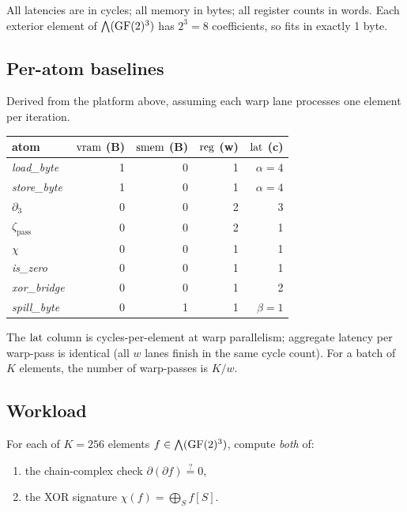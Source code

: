 All latencies are in cycles; all memory in bytes; all
register counts in words. Each exterior element of
$\bigwedge(\operatorname{GF}(2)^3)$ has $2^3 = 8$ coefficients, so
fits in exactly 1 byte.

\subsection{Per-atom baselines}\label{app-e:atoms}

Derived from the platform above, assuming each warp
lane processes one element per iteration.

\begin{center}
\begin{tabular}{l|rrrr}
atom           & $\operatorname{vram}$ (B) & $\operatorname{smem}$ (B) & $\operatorname{reg}$ (w) & $\operatorname{lat}$ (c) \\
\hline
\emph{load\_byte}  & 1 & 0 & 1 & $\alpha = 4$ \\
\emph{store\_byte} & 1 & 0 & 1 & $\alpha = 4$ \\
$\partial_3$       & 0 & 0 & 2 & 3 \\
$\zeta_{\text{pass}}$   & 0 & 0 & 2 & 1 \\
$\chi$             & 0 & 0 & 1 & 1 \\
\emph{is\_zero}    & 0 & 0 & 1 & 1 \\
\emph{xor\_bridge} & 0 & 0 & 1 & 2 \\
\emph{spill\_byte} & 0 & 1 & 1 & $\beta = 1$ \\
\end{tabular}
\end{center}

The $\operatorname{lat}$ column is cycles-per-element at warp
parallelism; aggregate latency per warp-pass is
identical (all $w$ lanes finish in the same cycle
count). For a batch of $K$ elements, the number of
warp-passes is $K/w$.

\subsection{Workload}\label{app-e:workload}

For each of $K = 256$ elements $f \in
\bigwedge(\operatorname{GF}(2)^3)$, compute \emph{both} of:
\begin{enumerate}[nosep,label=(\alph*)]
  \item the chain-complex check
    $\partial(\partial f) \stackrel{?}{=} 0$,
  \item the XOR signature $\chi(f) = \bigoplus_{S}
    f[S]$.
\end{enumerate}

